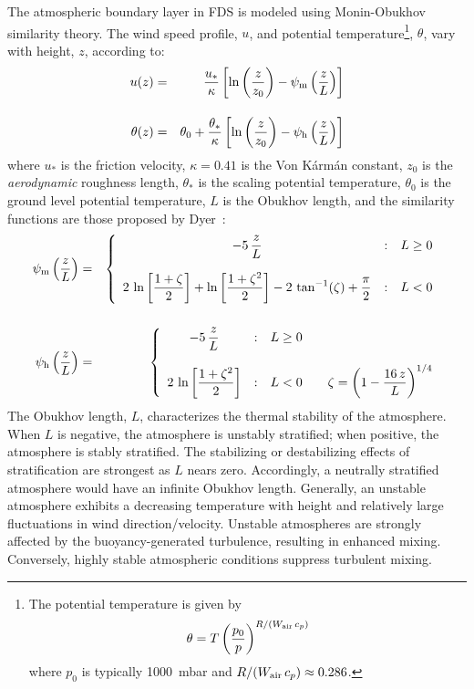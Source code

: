 \documentclass[11pt]{book}
\begin{document}
The atmospheric boundary layer in FDS is modeled using Monin-Obukhov similarity theory. The wind speed profile, $u$, and potential temperature\footnote{The potential temperature is given by $$\theta=T \left( \frac{p_0}{p} \right)^{R/(W_{\rm air} \, c_p)}$$ where $p_0$ is typically 1000~mbar and $R/(W_{\rm air} \, c_p) \approx 0.286$.}, $\theta$, vary with height, $z$, according to:
\begin{eqnarray}
   u(z)      &=&            \frac{u_*}{\kappa}     \left[ \ln \left( \frac{z}{z_0} \right) - \psi_{\rm m} \left( \frac{z}{L} \right) \right] \label{u_om} \\[.15in]
   \theta(z) &=& \theta_0 + \frac{\theta_*}{\kappa} \left[ \ln \left( \frac{z}{z_0} \right) - \psi_{\rm h} \left( \frac{z}{L} \right) \right]
\end{eqnarray}
where $u_*$ is the friction velocity, $\kappa=0.41$ is the Von K\'{a}rm\'{a}n constant, $z_0$ is the \emph{aerodynamic} roughness length, $\theta_*$ is the scaling potential temperature, $\theta_0$ is the ground level potential temperature, $L$ is the Obukhov length, and the similarity functions are those proposed by Dyer~\cite{Dyer:1974}:
\begin{eqnarray}
   \psi_{\rm m}\left(\frac{z}{L}\right) &=& \left\{ \begin{array}{c@{\quad:\quad}l} \displaystyle -5 \, \frac{z}{L} & L \ge 0 \\[.2in]  \displaystyle 2 \, \ln \left[\frac{1+\zeta}{2}\right] + \ln \left[\frac{1+\zeta^2}{2}\right]-2 \, \tan^{-1}(\zeta) + \frac{\pi}{2} & L<0 \end{array} \right.  \\[.2in]
   \psi_{\rm h}\left(\frac{z}{L}\right) &=& \left\{ \begin{array}{c@{\quad:\quad}l} \displaystyle -5 \, \frac{z}{L} & L \ge 0 \\[.2in]  \displaystyle 2 \, \ln \left[\frac{1+\zeta^2}{2}\right] & L<0 \quad \quad  \displaystyle \zeta=\left( 1 - \frac{16 \, z}{L} \right)^{1/4}  \end{array} \right.
\end{eqnarray}
The Obukhov length, $L$, characterizes the thermal stability of the atmosphere. When $L$ is negative, the atmosphere is unstably stratified; when positive, the atmosphere is stably stratified.  The stabilizing or destabilizing effects of stratification are strongest as $L$ nears zero.  Accordingly, a neutrally stratified atmosphere would have an infinite Obukhov length. Generally, an unstable atmosphere exhibits a decreasing temperature with height and relatively large fluctuations in wind direction/velocity. Unstable atmospheres are strongly affected by the buoyancy-generated turbulence, resulting in enhanced mixing.  Conversely, highly stable atmospheric conditions suppress turbulent mixing.
\end{document}
